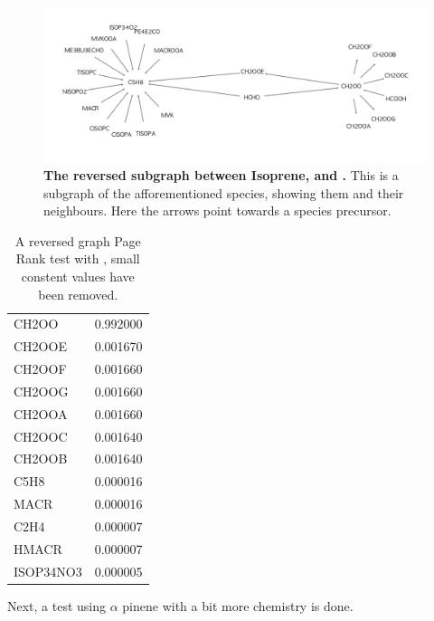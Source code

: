 \begin{figure}[H]
  \centering
  \includegraphics[width=\textwidth]{figures_c3/prtest0.png}
\caption{\textbf{The reversed subgraph between Isoprene,  and .} This is a subgraph of the afforementioned species, showing them and their neighbours. Here the arrows point towards a species precursor. }
\label{fig:prtest0}
\end{figure}

\begin{table}[H]
    \centering
    \begin{tabular}[width=\textwidth]{lr}
    \toprule
    CH2OO      &  0.992000 \\
    CH2OOE     &  0.001670 \\
    CH2OOF     &  0.001660 \\
    CH2OOG     &  0.001660 \\
    CH2OOA     &  0.001660 \\
    CH2OOC     &  0.001640 \\
    CH2OOB     &  0.001640 \\
    C5H8       &  0.000016 \\
    \midrule
    MACR       &  0.000016 \\
    C2H4       &  0.000007 \\
    HMACR      &  0.000007 \\
    ISOP34NO3  &  0.000005 \\
    \bottomrule
    \end{tabular}
\caption{A reversed graph Page Rank test with , small constent values have been removed.}
\label{tab:ch2oo}
\end{table} 

Next, a test using $\alpha$ pinene with a bit more chemistry is done. 


